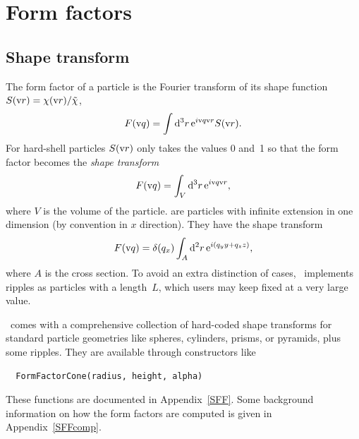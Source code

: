 \section{Form factors}


\subsection{Shape transform}

The form factor %
of a particle is the Fourier transform
of its shape function $S(\text{v}{r})=\chi(\text{v}{r})/\tilde\chi$,
%
%
%
\begin{equation}
  F(\text{v}{q})=\int {\rm d}^3r\, {\rm e}^{i\text{v}{q}\text{v}{r}} S(\text{v}{r}).
\end{equation}
For hard-shell particles %
$S(\text{v}{r})$ only takes the values 0 and~1
so that the form factor becomes
the \textit{shape transform}
%
\begin{equation}\label{EFFhardshell}
  F(\text{v}{q})=\int_V {\rm d}^3r\, {\rm e}^{i\text{v}{q}\text{v}{r}},
\end{equation}
where $V$ is the volume of the particle.
%
%
 are particles with infinite extension in one dimension
(by convention in $x$ direction).
They have the shape transform
\begin{equation}\label{EFFripple}
  F(\text{v}{q})=\delta(q_x)\int_A {\rm d}^2r\, {\rm e}^{i(q_y y + q_z z)},
\end{equation}
where $A$ is the cross section.
To avoid an extra distinction of cases,
\BornAgain\ implements ripples as particles with a  length~$L$,
which users may keep fixed at a very large value.

\BornAgain\ comes with a comprehensive collection of hard-coded
shape transforms for standard particle geometries like
spheres, cylinders, prisms, or pyramids,
plus some ripples.
They are available through constructors like
\begin{lstlisting}
  FormFactorCone(radius, height, alpha)
\end{lstlisting}
These functions are documented in Appendix~\ref{SFF}.
Some background information on how the form factors are computed
is given in Appendix~\ref{SFFcomp}.

